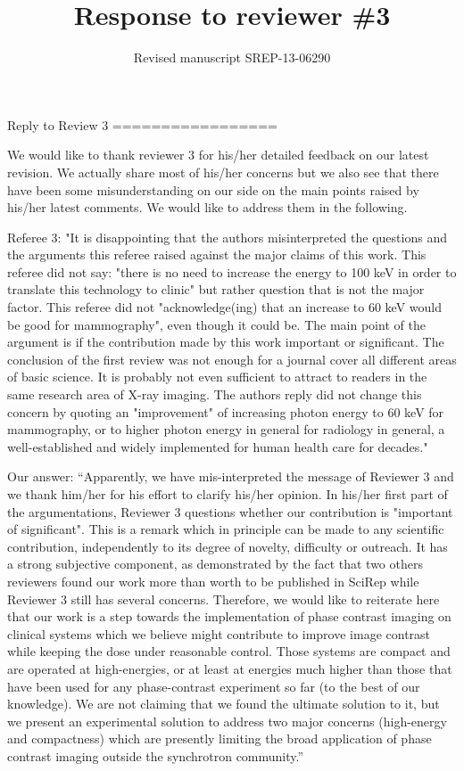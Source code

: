 \documentclass[a4paper,english]{scrartcl} \usepackage[detect-all]{siunitx}
\title{Response to reviewer \#3} \author{Revised manuscript SREP-13-06290}
\date{}
\begin{document}
 \maketitle

\noindent

Reply to Review 3
=================

We would like to thank reviewer 3 for his/her detailed feedback on our
latest revision. We actually share most of his/her concerns but we also see
that there have been some misunderstanding on our side on the main points
raised by his/her latest comments. We would like to address them in the
following. 

Referee 3: "It is disappointing that the authors misinterpreted the
questions and the arguments this referee raised against the major claims of
this work. This referee did not say: "there is no need to increase the
energy to 100 keV in order to translate this technology to clinic" but
rather question that is not the major factor. This referee did not
"acknowledge(ing) that an increase to 60 keV would be good for mammography",
even though it could be. The main point of the argument is if the
contribution made by this work important or significant. The conclusion of
the first review was not enough for a journal cover all different areas of
basic science. It is probably not even sufficient to attract to readers in
the same research area of X-ray imaging. The authors reply did not change
this concern by quoting an "improvement" of increasing photon energy to 60
keV for mammography, or to higher photon energy in general for radiology in
general, a well-established and widely implemented for human health care for
decades."

Our answer: “Apparently, we have mis-interpreted the message of Reviewer 3
and we thank him/her for his effort to clarify his/her opinion. In his/her
first part of the argumentations, Reviewer 3 questions whether our
contribution is "important of significant". This is a remark which in
principle can be made to any scientific contribution, independently to its
degree of novelty, difficulty or outreach. It has a strong subjective
component, as demonstrated by the fact that two others reviewers found our
work more than worth to be published in SciRep while Reviewer 3 still has
several concerns. Therefore, we would like to reiterate here that our work
is a step towards the implementation of phase contrast imaging on clinical
systems which we believe might contribute to improve image contrast while
keeping the dose under reasonable control. Those systems are compact and are
operated at high-energies, or at least at energies much higher than those
that have been used for any phase-contrast experiment so far (to the best of
our knowledge). We are not claiming that we found the ultimate solution to
it, but we present an experimental solution to address two major concerns
(high-energy and compactness) which are presently limiting the broad
application of phase contrast imaging outside the synchrotron community.” 
\end{document}
